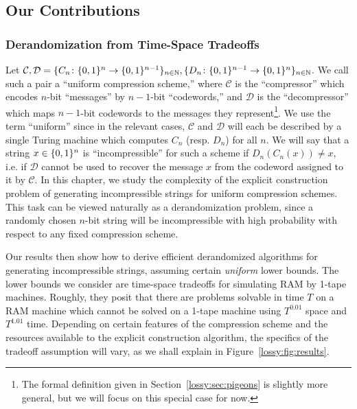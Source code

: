 

\subsection{Our Contributions}\label{lossy:subsec:contr}
\subsubsection{Derandomization from Time-Space Tradeoffs}
Let $\mathcal{C}, \mathcal{D} = \{C_n\colon \{0,1\}^{n} \rightarrow \{0,1\}^{n-1}\}_{n \in \mathbb{N}}, \{D_n\colon \{0,1\}^{n-1} \rightarrow \{0,1\}^{n}\}_{n \in \mathbb{N}}$. We call such a pair a ``uniform compression scheme,'' where $\mathcal{C}$ is the ``compressor'' which encodes $n$-bit ``messages'' by $n-1$-bit ``codewords,'' and $\mathcal{D}$ is the ``decompressor'' which maps $n-1$-bit codewords to the messages they represent\footnote{The formal definition given in Section~\ref{lossy:sec:pigeons} is slightly more general, but we will focus on this special case for now.}. We use the term ``uniform'' since in the relevant cases, $\mathcal{C}$ and $\mathcal{D}$ will each be described by a single Turing machine which computes $C_n$ (resp. $D_n$) for all $n$. We will say that a string $x \in \{0,1\}^n$ is ``incompressible'' for such a scheme if $D_n(C_n(x)) \neq x$, i.e. if $\mathcal{D}$ cannot be used to recover the message $x$ from the codeword assigned to it by $\mathcal{C}$. In this chapter, we study the complexity of the explicit construction problem of generating incompressible strings for uniform compression schemes. This task can be viewed naturally as a derandomization problem, since a randomly chosen $n$-bit string will be incompressible with high probability with respect to any fixed compression scheme.

Our results then show how to derive efficient derandomized algorithms for generating incompressible strings, assuming certain \emph{uniform} lower bounds. The lower bounds we consider are time-space tradeoffs for simulating RAM by 1-tape machines. Roughly, they posit that there are problems solvable in time $T$ on a RAM machine which cannot be solved on a 1-tape machine using $T^{0.01}$ space and $T^{1.01}$ time. Depending on certain features of the compression scheme and the resources available to the explicit construction algorithm, the specifics of the tradeoff assumption will vary, as we shall explain in Figure~\ref{lossy:fig:results}.

